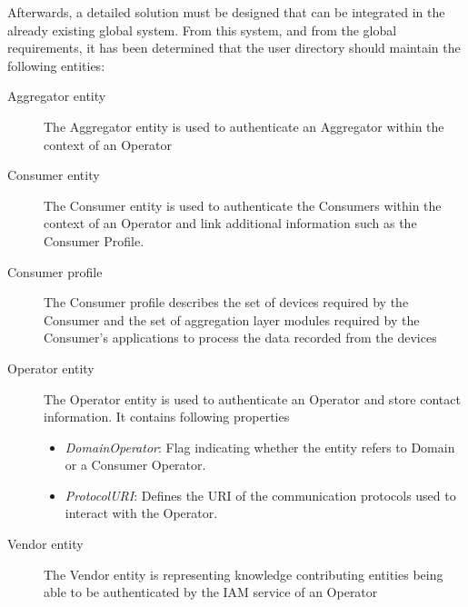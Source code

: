 Afterwards, a detailed solution must be designed that can be integrated in the already existing global system. From this system, and from the global requirements, it has been determined that the user directory should maintain the following entities:
\begin{description}
	\item[Aggregator entity] The Aggregator entity is used to authenticate an Aggregator within the context of an Operator
	\item[Consumer entity] The Consumer entity is used to authenticate the Consumers within the context of an Operator and link additional information such as the Consumer Profile.
	\item[Consumer profile] The Consumer profile describes the set of devices required by the Consumer and the set of aggregation layer modules required by the Consumer's applications to process the data recorded from the devices
	\item[Operator entity] The Operator entity is used to authenticate an Operator and store contact information. It contains following properties
	\begin{itemize}
		\item \emph{DomainOperator}: Flag indicating whether the entity refers to Domain or a Consumer Operator.
		\item \emph{ProtocolURI}: Defines the URI of the communication protocols used to interact with the Operator.
	\end{itemize}
	\item[Vendor entity] The Vendor entity is representing knowledge contributing entities being able to be	authenticated by the IAM service of an Operator
\end{description}
